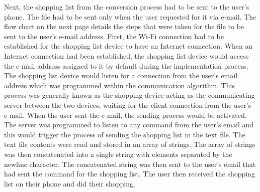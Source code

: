 Next, the shopping list from the conversion process had to be sent to the user's phone. The file had to be sent only when the user requested for it via e-mail. The flow chart on the next page details the steps that were taken for the file to be sent to the user's e-mail address. First, the Wi-Fi connection had to be established for the shopping list device to have an Internet connection. When an Internet connection had been established, the shopping list device would access the e-mail address assigned to it by default during the implementation process. The shopping list device would listen for a connection from the user's email address which was programmed within the communication algorithm. This process was generally known as the shopping device acting as the communicating server between the two devices, waiting for the client connection from the user's e-mail. When the user sent the e-mail, the sending process would be activated. The server was programmed to listen to any command from the user's email and this would trigger the process of sending the shopping list in the text file. The text file contents were read and stored  in an array of strings. The array of strings was then concatenated into a single string with elements separated by the newline character. The concatenated string was then sent to the user's email that had sent the command for the shopping list. The user then received the shopping list on their phone and did their shopping.
\clearpage
